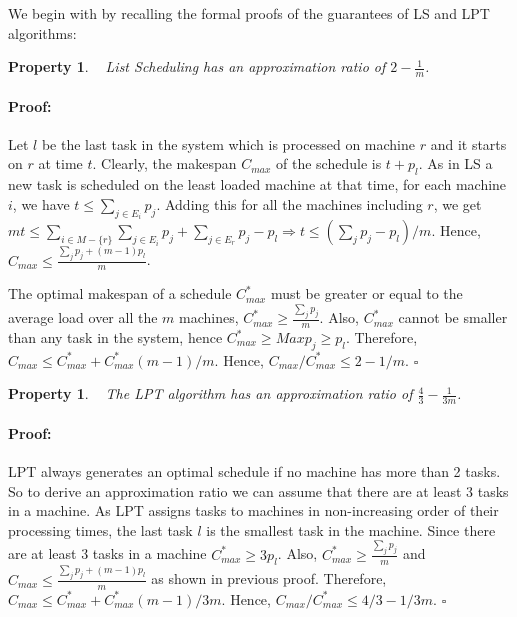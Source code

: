 \documentclass[12pt]{article}
\theoremstyle{mystyle}
\newtheorem{property}[theorem]{Property}
\newenvironment{myproof}{\paragraph{Proof:}}{\hfill$\square$}
\begin{document}
   We begin with by recalling the formal proofs of the guarantees of LS and LPT algorithms:
   \begin{property}~\cite{Graham66} List Scheduling has an approximation ratio of $2-\frac{1}{m}$.
   \end{property}
   \begin{myproof}
   Let $l$ be the last task in the system which is processed on machine $r$ and it starts on $r$ at time $t$. Clearly, the makespan $C_{max}$ of the schedule is $t+p_l$. As in LS a new task is scheduled on the least loaded machine at that time, for each machine $i$, we have $t\leq \sum\limits
   _{j \in E_i}p_j$. Adding this for all the machines including  $r$, we get $m t\leq \sum\limits_{i\in M-\{r\}}\sum\limits_{j \in E_i}p_j +\sum\limits_{j \in E_r}p_j - p_l\Rightarrow t\leq (\sum\limits_{j}p_j - p_l)/ m $. Hence, $C_{max}\leq \frac{\sum_{j}p_j + (m-1)p_l}{m}$.
    
   The optimal makespan of a schedule $C^*_{max}$ must be greater or equal to the average load over all the $m$ machines, $C^*_{max}\geq \frac{\sum_{j}p_j}{m}$. Also, $C^*_{max}$ cannot be smaller than any task in the system, hence $C^*_{max}\geq Max p_j \geq p_l$.  Therefore,  $C_{max} \leq C^*_{max}+C^*_{max}(m-1)/m $. Hence, $C_{max}/C^*_{max} \leq 2-1/m$.
    \end{myproof}
    
     \begin{property}~\cite{Graham69boundson} The LPT algorithm has an approximation ratio of $\frac{4}{3}-\frac{1}{3m}$.
     \end{property}
     \begin{myproof}
     LPT always generates an optimal schedule if no machine has more than 2 tasks. So to derive an approximation ratio we can assume that there are at least 3 tasks in a machine.
     As LPT assigns tasks to machines in non-increasing order of their processing times, the last task $l$ is the smallest task in the machine. Since there are at least 3 tasks in a machine $C^*_{max}\geq 3 p_l$.
     Also, $C^*_{max} \geq \frac{\sum_{j}p_j}{m}$ and $C_{max}\leq \frac{\sum_{j}p_j + (m-1)p_l}{m} $ as shown in previous proof. Therefore,  $C_{max} \leq C^*_{max}+C^*_{max}(m-1)/3m $.  Hence, $C_{max}/C^*_{max} \leq 4/3-1/3m$. 
     \end{myproof}
   
\end{document}

